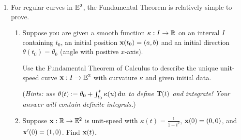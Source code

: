 \begin{exercises}
\begin{enumerate}
	\item\label{exs:fundthm2} For regular curves in $\mathbb{E}^2$, the Fundamental Theorem is relatively simple to prove.
	\begin{enumerate}
	  \item Suppose you are given a smooth function $\kappa:I\to\mathbb{R}$ on an interval $I$ containing $t_0$, an initial position ${\mathbf{x}}(t_0)=(a,b)$ and an initial direction $\theta(t_0)=\theta_0$ (angle with positive $x$-axis).\par
		Use the Fundamental Theorem of Calculus to describe the unique unit-speed curve ${\mathbf{x}}:I\to\mathbb{E}^2$ with curvature $\kappa$ and given initial data.\par
		(\emph{Hints: use $\theta(t):=\theta_0+\int_{t_0}^t\kappa(u)\,{\mathrm{d} u}$ to define ${\mathbf{T}}(t)$ and integrate! Your answer will contain definite integrals.})
		
		\item Suppose ${\mathbf{x}}:\mathbb{R}\to\mathbb{E}^2$ is unit-speed with $\kappa(t)=\frac 1{1+t^2}$, ${\mathbf{x}}(0)=(0,0)$, and ${\mathbf{x}}'(0)=(1,0)$. Find ${\mathbf{x}}(t)$.
	\end{enumerate}
	
	
	
	

% 
% 
	

\end{enumerate}
\end{exercises}
